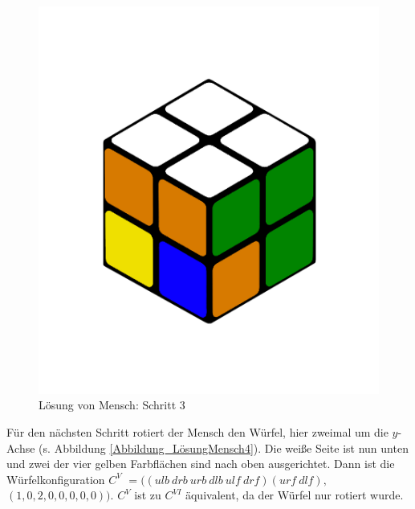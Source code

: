 \documentclass[12pt,a4paper, usenames, dvipsnames]{article}
\theoremstyle{mystyle}
\theoremstyle{definition}
\begin{document}
\begin{figure}[H]
\centering
\includegraphics[scale=0.12]{menschSchritt3.png}
\caption[Lösung von Mensch: Schritt 3]{Lösung von Mensch: Schritt 3}
\label{Abbildung_LösungMensch3}
\end{figure} 

Für den nächsten Schritt rotiert der Mensch den Würfel, hier zweimal um die $y$-Achse (s. Abbildung \ref{Abbildung_LösungMensch4}). Die weiße Seite ist nun unten und zwei der vier gelben Farbflächen sind nach oben ausgerichtet. Dann ist die Würfelkonfiguration $C^V $ $= (( \textit{ulb} \ \textit{drb} \ \textit{urb} \ \textit{dlb} \ \textit{ulf} \ \textit{drf} )( \textit{urf} \ \textit{dlf} ),$ $(1,0,2,0,0,0,0,0))$. $C^V$ ist zu $C^{VI}$ äquivalent, da der Würfel nur rotiert wurde.
\end{document}

